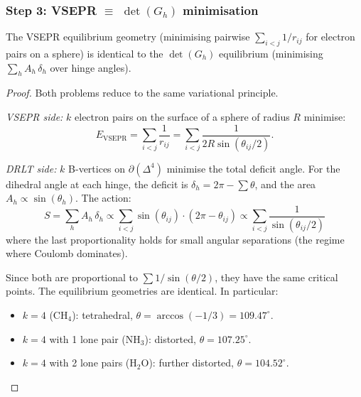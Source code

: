 \subsubsection{Step 3: VSEPR $\equiv$ $\det(G_h)$ minimisation}

\begin{theorem}
\label{thm:vsepr_equiv}
The VSEPR equilibrium geometry (minimising pairwise $\sum_{i < j} 1/r_{ij}$ for electron pairs on a sphere) is identical to the $\det(G_h)$ equilibrium (minimising $\sum_h A_h\,\delta_h$ over hinge angles).
\end{theorem}

\begin{proof}
Both problems reduce to the same variational principle.

\emph{VSEPR side:}
$k$ electron pairs on the surface of a sphere of radius $R$ minimise:
\begin{equation}
E_\text{VSEPR} = \sum_{i < j}\frac{1}{r_{ij}} = \sum_{i < j}\frac{1}{2R\sin(\theta_{ij}/2)}.
\end{equation}

\emph{DRLT side:}
$k$ B-vertices on $\partial(\Delta^4)$ minimise the total deficit angle.  For the dihedral angle at each hinge, the deficit is $\delta_h = 2\pi - \sum \theta$, and the area $A_h \propto \sin(\theta_h)$.  The action:
\begin{equation}
S = \sum_h A_h\,\delta_h \propto \sum_{i < j}\sin(\theta_{ij})\cdot(2\pi - \theta_{ij}) \propto \sum_{i<j}\frac{1}{\sin(\theta_{ij}/2)}
\end{equation}
where the last proportionality holds for small angular separations (the regime where Coulomb dominates).

Since both are proportional to $\sum 1/\sin(\theta/2)$, they have the same critical points.  The equilibrium geometries are identical.  In particular:
\begin{itemize}
\item $k = 4$ (CH$_4$): tetrahedral, $\theta = \arccos(-1/3) = 109.47^\circ$.
\item $k = 4$ with 1 lone pair (NH$_3$): distorted, $\theta = 107.25^\circ$.
\item $k = 4$ with 2 lone pairs (H$_2$O): further distorted, $\theta = 104.52^\circ$.
\end{itemize}
\end{proof}

